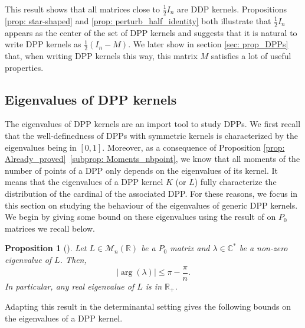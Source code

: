 \documentclass{article}
\numberwithin{equation}{section}
\renewcommand{\leq}{\leqslant}
\newcommand{\bR}{\mathbb{R}}
\theoremstyle{plain}
\newtheorem{proposition}{Proposition}[section]
\begin{document}
\noindent This result shows that all matrices close to $\frac{1}{2}I_n$ are DDP kernels. Propositions \ref{prop: star-shaped} and \ref{prop: perturb_half_identity} both illustrate that $\frac{1}{2}I_n$ appears as the center of the set of DPP kernels and suggests that it is natural to write DPP kernels as $\frac{1}{2}(I_n-M)$. We later show in section \ref{sec: prop_DPPs} that, when writing DPP kernels this way, this matrix $M$ satisfies a lot of useful properties.

\subsection{Eigenvalues of DPP kernels}

The eigenvalues of DPP kernels are an import tool to study DPPs. We first recall that the well-definedness of DPPs with symmetric kernels is characterized by the eigenvalues being in $[0, 1]$. Moreover, as a consequence of Proposition \ref{prop: Already_proved}~\ref{subprop: Moments_nbpoint}, we know that all moments of the number of points of a DPP only depends on the eigenvalues of its kernel. It means that the eigenvalues of a DPP kernel $K$ (or $L$) fully characterize the distribution of the cardinal of the associated DPP. For these reasons, we focus in this section on studying the behaviour of the eigenvalues of generic DPP kernels. We begin by giving some bound on these eigenvalues using the result of \cite{Kellogg} on $P_0$ matrices we recall below.

\begin{proposition}[\cite{Kellogg}] \label{prop: ev_Lens}
Let $L\in\mathcal{M}_n(\bR)$ be a $P_0$ matrix and $\lambda\in\mathbb{C}^*$ be a non-zero eigenvalue of $L$. Then,
\[|\arg(\lambda)|\leq\pi - \frac{\pi}{n}.\]
In particular, any real eigenvalue of $L$ is in $\bR_+$.
\end{proposition}

\noindent Adapting this result in the determinantal setting gives the following bounds on the eigenvalues of a DPP kernel.
\end{document}
